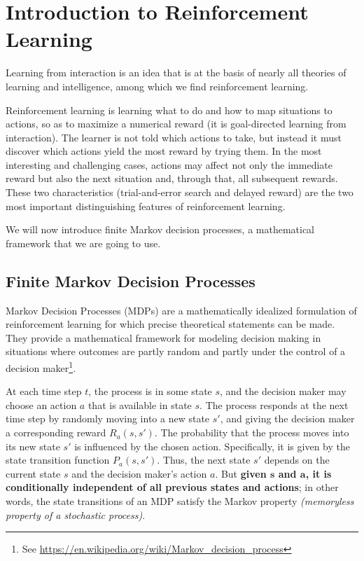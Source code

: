 \section{Introduction to Reinforcement Learning}
Learning from interaction is an idea that is at the basis of nearly all theories of learning and intelligence, among which we find reinforcement learning.

Reinforcement learning is learning what to do and how to map situations to actions, so as to maximize a numerical reward (it is goal-directed learning from interaction). The learner is not told which actions to take, but instead it must discover which actions yield the most reward by trying them. In the most interesting and challenging cases, actions may affect not only the immediate reward but also the next situation and, through that, all subsequent rewards. These two characteristics (trial-and-error search and delayed reward) are the two most important distinguishing features of reinforcement learning.

We will now introduce finite Markov decision processes, a mathematical framework that we are going to use.

\subsection{Finite Markov Decision Processes}
Markov Decision Processes (MDPs) are a mathematically idealized formulation of reinforcement learning for which precise theoretical statements can be made. They provide a mathematical framework for modeling decision making in situations where outcomes are partly random and partly under the control of a decision maker\footnote{See \url{https://en.wikipedia.org/wiki/Markov_decision_process}}.

At each time step $t$, the process is in some state $s$, and the decision maker may choose an action $a$ that is available in state $s$. The process responds at the next time step by randomly moving into a new state $s'$, and giving the decision maker a corresponding reward $R_a(s,s')$. The probability that the process moves into its new state $s'$ is influenced by the chosen action. Specifically, it is given by the state transition function $P_a(s,s')$. Thus, the next state $s'$ depends on the current state $s$ and the decision maker's action $a$. But \textbf{given $\boldsymbol{s}$ and $\boldsymbol{a}$, it is conditionally independent of all previous states and actions}; in other words, the state transitions of an MDP satisfy the Markov property \textit{(memoryless property of a stochastic process)}.

